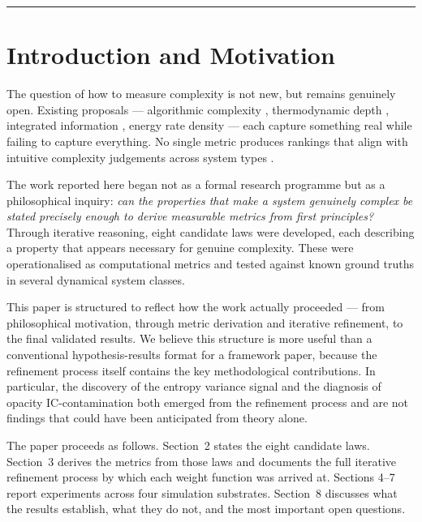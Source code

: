\documentclass[12pt,a4paper]{article}
\begin{document}
\rule{\linewidth}{0.4pt}

\section{Introduction and Motivation}

The question of how to measure complexity is not new, but remains genuinely
open.
Existing proposals --- algorithmic complexity \citep{kolmogorov1965},
thermodynamic depth \citep{lloyd1988}, integrated information
\citep{tononi2004}, energy rate density \citep{chaisson2001} --- each capture
something real while failing to capture everything.
No single metric produces rankings that align with intuitive complexity
judgements across system types \citep{gell-mann1996,ladyman2013}.

The work reported here began not as a formal research programme but as a
philosophical inquiry: \emph{can the properties that make a system genuinely
complex be stated precisely enough to derive measurable metrics from first
principles?}
Through iterative reasoning, eight candidate laws were developed, each
describing a property that appears necessary for genuine complexity.
These were operationalised as computational metrics and tested against known
ground truths in several dynamical system classes.

This paper is structured to reflect how the work actually proceeded ---
from philosophical motivation, through metric derivation and iterative
refinement, to the final validated results.
We believe this structure is more useful than a conventional
hypothesis-results format for a framework paper, because the refinement
process itself contains the key methodological contributions.
In particular, the discovery of the entropy variance signal and the diagnosis
of opacity IC-contamination both emerged from the refinement process and
are not findings that could have been anticipated from theory alone.

The paper proceeds as follows.
Section~2 states the eight candidate laws.
Section~3 derives the metrics from those laws and documents the full
iterative refinement process by which each weight function was arrived at.
Sections 4--7 report experiments across four simulation substrates.
Section~8 discusses what the results establish, what they do not, and
the most important open questions.
\end{document}
